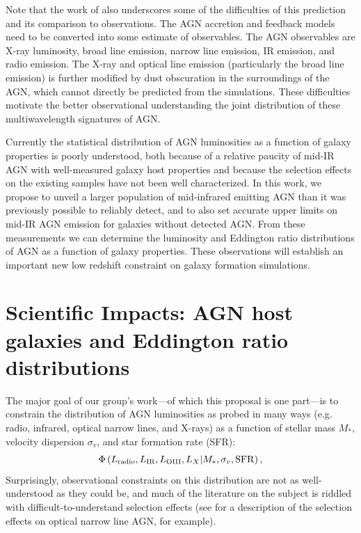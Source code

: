 \documentclass[12pt, preprint]{hacked-aastex}
\begin{document}
Note that the work of \cite{habouzit22a} also underscores some of the
difficulties of this prediction and its comparison to observations.
The AGN accretion and feedback models need to be converted into some
estimate of observables. The AGN observables are X-ray luminosity,
broad line emission, narrow line emission, IR emission, and radio
emission. The X-ray and optical line emission (particularly the broad
line emission) is further modified by dust obscuration in the
surroundings of the AGN, which cannot directly be predicted from the
simulations. These difficulties motivate the better observational
understanding the joint distribution of these multiwavelength
signatures of AGN.

Currently the statistical distribution of AGN luminosities as a
function of galaxy properties is poorly understood, both because of a
relative paucity of mid-IR AGN with well-measured galaxy host
properties and because the selection effects on the existing samples
have not been well characterized.  In this work, we propose to unveil
a larger population of mid-infrared emitting AGN than it was
previously possible to reliably detect, and to also set accurate upper
limits on mid-IR AGN emission for galaxies without detected AGN. From
these measurements we can determine the luminosity and Eddington ratio
distributions of AGN as a function of galaxy properties.  These
observations will establish an important new low redshift constraint
on galaxy formation simulations.

\section{Scientific Impacts: AGN host galaxies and Eddington ratio distributions}\label{sec:intro}


The major goal of our group's work---of which this proposal is one
part---is to constrain the distribution of AGN luminosities as probed
in many ways (e.g. radio, infrared, optical narrow lines, and X-rays)
as a function of stellar mass $M_\ast$, velocity dispersion
$\sigma_v$, and star formation rate (SFR):
\begin{equation}
\label{eq:model}
\Phi\left(L_{\rm radio}, L_{\rm IR}, L_{\rm OIII}, L_X | M_\ast, \sigma_v, {\rm SFR}\right),
\end{equation}
Surprisingly, observational constraints on this distribution are not
as well-understood as they could be, and much of the literature on the
subject is riddled with difficult-to-understand selection effects 
(see \cite{trump15a} for a description of the selection effects 
on optical narrow line AGN, for example).
\end{document}
